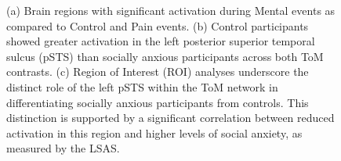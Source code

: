 \begin{figure}[!ht]
	\centering
	\caption{(a) Brain regions with significant activation during Mental events as compared to Control and Pain events. (b) Control participants showed greater activation in the left posterior superior temporal sulcus (pSTS) than socially anxious participants across both ToM contrasts. (c) Region of Interest (ROI) analyses underscore the distinct role of the left pSTS within the ToM network in differentiating socially anxious participants from controls. This distinction is supported by a significant correlation between reduced activation in this region and higher levels of social anxiety, as measured by the LSAS.}
    \vspace*{-10pt}
	\label{fig:fmri-results}
\end{figure}

